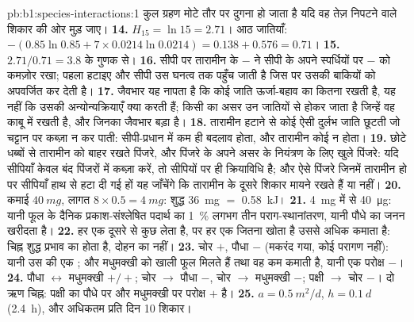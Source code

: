 \begin{solution}{pb:b1:species-interactions:1}
कुल ग्रहण मोटे तौर पर दुगना हो जाता है यदि वह तेज़ निपटने वाले शिकार की
ओर मुड़ जाए।
\textbf{14.} $H_{15} = \ln 15 = 2.71$। आठ जातियाँ: $-(0.85\ln 0.85
+ 7\times 0.0214\ln 0.0214) = 0.138 + 0.576 = 0.71$।
\textbf{15.} $2.71/0.71 = 3.8$ के गुणक से।
\textbf{16.} सीपी पर तारामीन के $-$ ने सीपी के अपने स्पर्धियों पर $-$ को
कमज़ोर रखा; पहला हटाइए और सीपी उस घनत्व तक पहुँच जाती है जिस पर उसकी
 बाकियों को अपवर्जित कर देती है।
\textbf{17.} जैवभार यह नापता है कि कोई जाति ऊर्जा-बहाव का कितना रखती है,
यह नहीं कि उसकी अन्योन्यक्रियाएँ क्या करती हैं; किसी  का असर
उन जातियों से होकर जाता है जिन्हें वह काबू में रखती है, और जिनका जैवभार
बड़ा है।
\textbf{18.} तारामीन हटाने से कोई ऐसी दुर्लभ जाति छूटती जो चट्टान पर
कब्ज़ा न कर पाती: सीपी-प्रधान  में कम ही बदलाव होता, और तारामीन
कोई  न होता।
\textbf{19.} छोटे धब्बों से तारामीन को बाहर रखते पिंजरे, और पिंजरे के
अपने असर के नियंत्रण के लिए खुले पिंजरे: यदि सीपियाँ केवल बंद पिंजरों में
कब्ज़ा करें, तो सीपियों पर  ही क्रियाविधि है; और ऐसे पिंजरे
जिनमें तारामीन हो पर सीपियाँ हाथ से हटा दी गई हों यह जाँचेंगे कि तारामीन
के दूसरे शिकार मायने रखते हैं या नहीं।
\textbf{20.} कमाई $\qty{40}{mg}$, लागत $8\times 0.5 = \qty{4}{mg}$: शुद्ध
\qty{36}{mg} $=$ \qty{0.58}{kJ}।
\textbf{21.} \qty{4}{mg} में से \qty{40}{\micro g}: यानी फूल के दैनिक
प्रकाश-संश्लेषित पदार्थ का \qty{1}{\%} लगभग तीन पराग-स्थानांतरण, यानी
पौधे का जनन खरीदता है।
\textbf{22.} हर एक दूसरे से कुछ लेता है, पर हर एक जितना खोता है उससे
अधिक कमाता है: चिह्न शुद्ध प्रभाव का होता है, दोहन का
नहीं।
\textbf{23.} चोर $+$, पौधा $-$ (मकरंद गया, कोई परागण नहीं): यानी उस
 की एक ; और मधुमक्खी को खाली फूल मिलते हैं तथा वह कम
कमाती है, यानी एक परोक्ष $-$।
\textbf{24.} पौधा $\leftrightarrow$ मधुमक्खी $+/+$; चोर $\to$ पौधा $-$,
चोर $\to$ मधुमक्खी $-$; पक्षी $\to$ चोर $-$। दो ऋण चिह्न: पक्षी का
पौधे पर और मधुमक्खी पर परोक्ष $+$ है।
\textbf{25.} $a = \qty{0.5}{m^2/d}$, $h = \qty{0.1}{d}$ (\qty{2.4}{h}),
और अधिकतम प्रति दिन \num{10} शिकार।
\end{solution}
